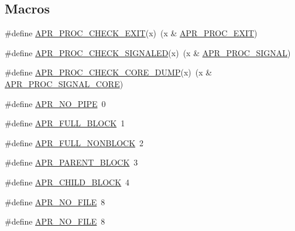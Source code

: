 \subsection*{Macros}
\begin{DoxyCompactItemize}
\item 
\#define \mbox{\hyperlink{group__apr__thread__proc_ga689b0f3953cde83a4092931bad8b7183}{A\+P\+R\+\_\+\+P\+R\+O\+C\+\_\+\+C\+H\+E\+C\+K\+\_\+\+E\+X\+IT}}(x)~(x \& \mbox{\hyperlink{group__apr__thread__proc_ggac097b4fa41e67024711c5983446d0951a977f140c82333af62aa4bed8c99a3ee2}{A\+P\+R\+\_\+\+P\+R\+O\+C\+\_\+\+E\+X\+IT}})
\item 
\#define \mbox{\hyperlink{group__apr__thread__proc_gaa0a8a0b8785cc9392059c7accd71f5f6}{A\+P\+R\+\_\+\+P\+R\+O\+C\+\_\+\+C\+H\+E\+C\+K\+\_\+\+S\+I\+G\+N\+A\+L\+ED}}(x)~(x \& \mbox{\hyperlink{group__apr__thread__proc_ggac097b4fa41e67024711c5983446d0951a7e3421d18abe458ca27822d19424225b}{A\+P\+R\+\_\+\+P\+R\+O\+C\+\_\+\+S\+I\+G\+N\+AL}})
\item 
\#define \mbox{\hyperlink{group__apr__thread__proc_ga2249e96191b5d98d33fb7875bce49410}{A\+P\+R\+\_\+\+P\+R\+O\+C\+\_\+\+C\+H\+E\+C\+K\+\_\+\+C\+O\+R\+E\+\_\+\+D\+U\+MP}}(x)~(x \& \mbox{\hyperlink{group__apr__thread__proc_ggac097b4fa41e67024711c5983446d0951a6b667be4983cb59e9bed37ee05a0dcce}{A\+P\+R\+\_\+\+P\+R\+O\+C\+\_\+\+S\+I\+G\+N\+A\+L\+\_\+\+C\+O\+RE}})
\item 
\#define \mbox{\hyperlink{group__apr__thread__proc_gab7cfcb8ed24e6c0a76cd41b5b113ae95}{A\+P\+R\+\_\+\+N\+O\+\_\+\+P\+I\+PE}}~0
\item 
\#define \mbox{\hyperlink{group__apr__thread__proc_ga646af57314e71f4647243f36dd03e5ea}{A\+P\+R\+\_\+\+F\+U\+L\+L\+\_\+\+B\+L\+O\+CK}}~1
\item 
\#define \mbox{\hyperlink{group__apr__thread__proc_gae0707f76da785490830fc3491093767c}{A\+P\+R\+\_\+\+F\+U\+L\+L\+\_\+\+N\+O\+N\+B\+L\+O\+CK}}~2
\item 
\#define \mbox{\hyperlink{group__apr__thread__proc_ga8653bab028b1c2b98754babc2547f988}{A\+P\+R\+\_\+\+P\+A\+R\+E\+N\+T\+\_\+\+B\+L\+O\+CK}}~3
\item 
\#define \mbox{\hyperlink{group__apr__thread__proc_gacad9da4db7a22f46715e50fb8ec1c939}{A\+P\+R\+\_\+\+C\+H\+I\+L\+D\+\_\+\+B\+L\+O\+CK}}~4
\item 
\#define \mbox{\hyperlink{group__apr__thread__proc_ga597fb6a501c20cc3a597fe6c613f4310}{A\+P\+R\+\_\+\+N\+O\+\_\+\+F\+I\+LE}}~8
\item 
\#define \mbox{\hyperlink{group__apr__thread__proc_ga597fb6a501c20cc3a597fe6c613f4310}{A\+P\+R\+\_\+\+N\+O\+\_\+\+F\+I\+LE}}~8

\end{DoxyCompactItemize}
